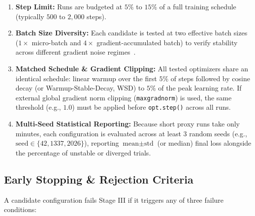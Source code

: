 \documentclass[11pt,a4paper]{article}
\renewcommand{\_}{\origunderscore\allowbreak}
\begin{document}
\begin{enumerate}[label=\textbf{M\arabic*.}, leftmargin=2.4em, itemsep=0.35em]
    \item \textbf{Step Limit:} Runs are budgeted at $5\%$ to $15\%$ of a full training schedule (typically $500$ to $2,000$ steps).
    \item \textbf{Batch Size Diversity:} Each candidate is tested at two effective batch sizes ($1\times$ micro-batch and $4\times$ gradient-accumulated batch) to verify stability across different gradient noise regimes~\cite{taniguchi2024adopt}.
    \item \textbf{Matched Schedule \& Gradient Clipping:} All tested optimizers share an identical schedule: linear warmup over the first $5\%$ of steps followed by cosine decay (or Warmup-Stable-Decay, WSD) to $5\%$ of the peak learning rate. If external global gradient norm clipping (\texttt{max\_grad\_norm}) is used, the same threshold (e.g., $1.0$) must be applied before \texttt{opt.step()} across all runs.
    \item \textbf{Multi-Seed Statistical Reporting:} Because short proxy runs take only minutes, each configuration is evaluated across at least 3 random seeds (e.g., $\text{seed} \in \{42, 1337, 2026\}$), reporting $\text{mean} \pm \text{std}$ (or median) final loss alongside the percentage of unstable or diverged trials.
\end{enumerate}

\subsection{Early Stopping \& Rejection Criteria}
\noindent
A candidate configuration fails Stage III if it triggers any of three failure conditions:
\end{document}
